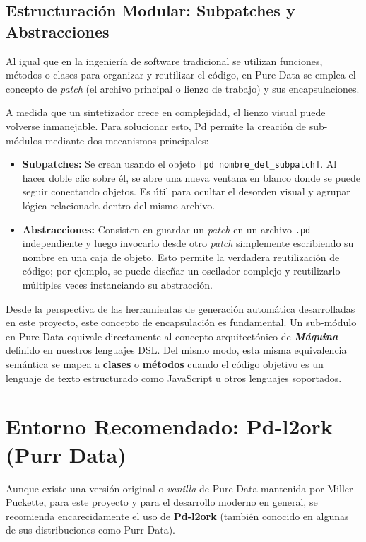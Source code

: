 \subsection{Estructuración Modular: Subpatches y Abstracciones}

Al igual que en la ingeniería de software tradicional se utilizan funciones, métodos o clases para organizar y reutilizar el código, en Pure Data se emplea el concepto de \textit{patch} (el archivo principal o lienzo de trabajo) y sus encapsulaciones.

A medida que un sintetizador crece en complejidad, el lienzo visual puede volverse inmanejable. Para solucionar esto, Pd permite la creación de sub-módulos mediante dos mecanismos principales:
\begin{itemize}
    \item \textbf{Subpatches:} Se crean usando el objeto \verb|[pd nombre_del_subpatch]|. Al hacer doble clic sobre él, se abre una nueva ventana en blanco donde se puede seguir conectando objetos. Es útil para ocultar el desorden visual y agrupar lógica relacionada dentro del mismo archivo.
    \item \textbf{Abstracciones:} Consisten en guardar un \textit{patch} en un archivo \texttt{.pd} independiente y luego invocarlo desde otro \textit{patch} simplemente escribiendo su nombre en una caja de objeto. Esto permite la verdadera reutilización de código; por ejemplo, se puede diseñar un oscilador complejo y reutilizarlo múltiples veces instanciando su abstracción.
\end{itemize}

Desde la perspectiva de las herramientas de generación automática desarrolladas en este proyecto, este concepto de encapsulación es fundamental. Un sub-módulo en Pure Data equivale directamente al concepto arquitectónico de \textbf{\textit{Máquina}} definido en nuestros lenguajes DSL. Del mismo modo, esta misma equivalencia semántica se mapea a \textbf{clases} o \textbf{métodos} cuando el código objetivo es un lenguaje de texto estructurado como JavaScript u otros lenguajes soportados.

\section{Entorno Recomendado: Pd-l2ork (Purr Data)}

Aunque existe una versión original o \textit{vanilla} de Pure Data mantenida por Miller Puckette, para este proyecto y para el desarrollo moderno en general, se recomienda encarecidamente el uso de \textbf{Pd-l2ork} (también conocido en algunas de sus distribuciones como Purr Data). 

